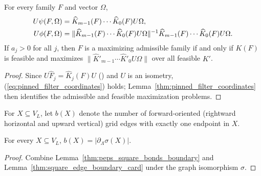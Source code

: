 \begin{lemma}
    \label{thm:pinned_filter_output_maximum}
    \leanok
    For every family $F$ and vector $\Omega$,
    \begin{align}
        U\psi(F,\Omega) & =\widehat K_{m-1}(F)\cdots\widehat K_0(F)U\Omega,
        \notag                                                              \\
        U\phi(F,\Omega) & =
        \|\widehat K_{m-1}(F)\cdots\widehat K_0(F)U\Omega\|^{-1}
        \widehat K_{m-1}(F)\cdots\widehat K_0(F)U\Omega.
        \label{eq:pinned_filter_coordinates}
    \end{align}
    If $a_j>0$ for all $j$, then $F$ is a maximizing admissible family if and only if $K(F)$ is feasible and maximizes $\|\widehat K'_{m-1}\cdots\widehat K'_0U\Omega\|$ over all feasible $K'$.
\end{lemma}
\begin{proof}
    \leanok
    Since $U\widehat F_j=\widehat K_j(F)U$ (\cite{QICLean2026FilterOutput}) and $U$ is an isometry, (\ref{eq:pinned_filter_coordinates}) holds; Lemma~\ref{thm:pinned_filter_coordinates} then identifies the admissible and feasible maximization problems.
\end{proof}

\begin{definition}
    \label{def:pinned_filter_crossings}
    \leanok
    For $X\subseteq V_L$, let $b(X)$ denote the number of forward-oriented (rightward horizontal and upward vertical) grid edges with exactly one endpoint in $X$.
\end{definition}

\begin{lemma}
    \label{thm:pinned_filter_crossings}
    \leanok
    For every $X\subseteq V_L$, $b(X)=|\partial_\Lambda\sigma(X)|$.
\end{lemma}
\begin{proof}
    \leanok
    Combine Lemma~\ref{thm:peps_square_bonds_boundary} and Lemma~\ref{thm:square_edge_boundary_card} under the graph isomorphism $\sigma$.
\end{proof}


